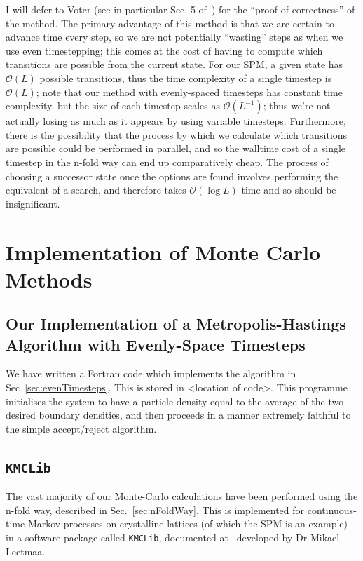 I will defer to Voter (see in particular Sec. 5 of~\cite{voterKMC}) for the ``proof of correctness'' of the
method. The primary advantage of this method is that we are certain to advance time every step, so we are
not potentially
``wasting'' steps as
when we use even 
timestepping; this comes at the cost of having to compute which transitions are possible from the current
state. For our SPM, a given state has $\mathcal{O}(L)$ possible transitions, thus the time complexity
of a single timestep is $\mathcal{O}(L)$; note that our method with evenly-spaced timesteps has constant
time complexity, but the size of each timestep scales as $\mathcal{O}(L^{-1})$; thus we're not actually
losing as much as it appears by using variable timesteps. Furthermore, there is the possibility that the
process by which we calculate which transitions are possible could be performed in parallel, and so
the walltime cost of a single timestep in the n-fold way can end up comparatively cheap. The process of
choosing a successor state once the options are found involves performing the equivalent of a search, and
therefore takes $\mathcal{O}(\log{L})$ time and so should be insignificant.


\section{Implementation of Monte Carlo Methods}
\subsection{Our Implementation of a Metropolis-Hastings Algorithm with Evenly-Space Timesteps}
We have written a Fortran code which implements the algorithm in Sec~\ref{sec:evenTimesteps}. This is
stored in <location of code>. This programme initialises the system to have a particle density
equal to the average of the two desired boundary densities, and then proceeds in a manner extremely
faithful to the simple accept/reject algorithm.


\subsection{\texttt{KMCLib}} \label{sec:kmcLib}
The vast majority of our Monte-Carlo calculations have been performed using the n-fold way, described in
Sec.~\ref{sec:nFoldWay}. This is implemented for continuous-time Markov processes on crystalline lattices
(of which the SPM is an example) in a software package called \texttt{KMCLib}, documented 
at~\cite{leetmaa2014KMCLib} developed by Dr Mikael Leetmaa.

